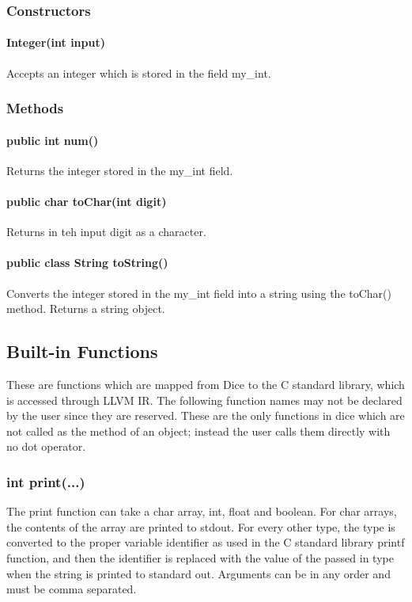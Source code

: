 \begin{homeworkProblem}
	\subsubsection{Constructors}
	\paragraph{Integer(int input)}
	Accepts an integer which is stored in the field my\_int.
	
	\subsubsection{Methods}
	\paragraph{public int num()}
	Returns the integer stored in the my\_int field.
	\paragraph{public char toChar(int digit)}
	Returns in teh input digit as a character.
	\paragraph{public class String toString()}
	Converts the integer stored in the my\_int field into a string using the toChar() method. Returns a string object.
	\subsection{Built-in Functions}
	These are functions which are mapped from Dice to the C standard library, which is accessed through LLVM IR. The following function names may not be declared by the user since they are reserved. These are the only functions in dice which are not called as the method of an object; instead the user calls them directly with no dot operator.
	\subsubsection{int print(...)}
	The print function can take a char array, int, float and boolean. For char arrays, the contents of the array are printed to stdout. For every other type, the type is converted to the proper variable identifier as used in the C standard library printf function, and then the identifier is replaced with the value of the passed in type when the string is printed to standard out. Arguments can be in any order and must be comma separated.

\end{homeworkProblem}
